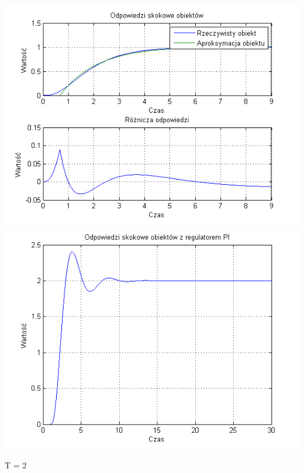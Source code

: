 \documentclass[10pt,a4paper]{article}
\begin{document}
\begin{center}
\includegraphics[scale=1]{images/jeden/skrypt_97.png}\\
\includegraphics[scale=1]{images/jeden/skrypt_98.png}\\
\end{center}
\newpage
T = 2
\end{document}
